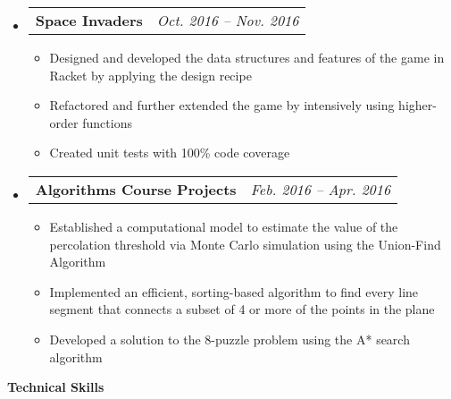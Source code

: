 \documentclass[letterpaper,11pt]{article}
\makeatletter
\newcommand{\resitem}[1]{
    \item #1
    \vspace{-2pt}
}
\newcommand{\resheading}[1]{{\large \colorbox{mygrey}{\begin{minipage}{\textwidth}{\textbf{#1 \vphantom{p\^{E}}}}\end{minipage}}}}
\newcommand{\ressubheadingproj}[2]{
\begin{tabular*}{6.80in}{l@{\extracolsep{\fill}}r}
    \textbf{#1} & \textit{#2} \\
\end{tabular*}\vspace{-6pt}}
\makeatother
\begin{document}
    \begin{itemize}
        \item\ressubheadingproj
        {Space Invaders}
        {Oct. 2016 -- Nov. 2016}
        {\footnotesize
        \begin{itemize}
            \resitem
            {Designed and developed the data structures and features of the game in
            Racket by applying the design recipe}
            \resitem
            {Refactored and further extended the game by intensively using higher-order
            functions}
            \resitem
            {Created unit tests with 100\% code coverage}

        \end{itemize}
        }
    \end{itemize}

    \begin{itemize}
        \item\ressubheadingproj
        {Algorithms Course Projects}{Feb. 2016 -- Apr. 2016}
        {\footnotesize
        \begin{itemize}
            \resitem
            {Established a computational model to estimate the value of the percolation
            threshold via Monte Carlo simulation using the Union-Find Algorithm}
            \resitem
            {Implemented an efficient, sorting-based algorithm to find every line segment
            that connects a subset of 4 or more of the points in the plane}
            \resitem
            {Developed a solution to the 8-puzzle problem using the A* search algorithm}
        \end{itemize}
        }
    \end{itemize}


    \resheading{Technical Skills}
\end{document}
